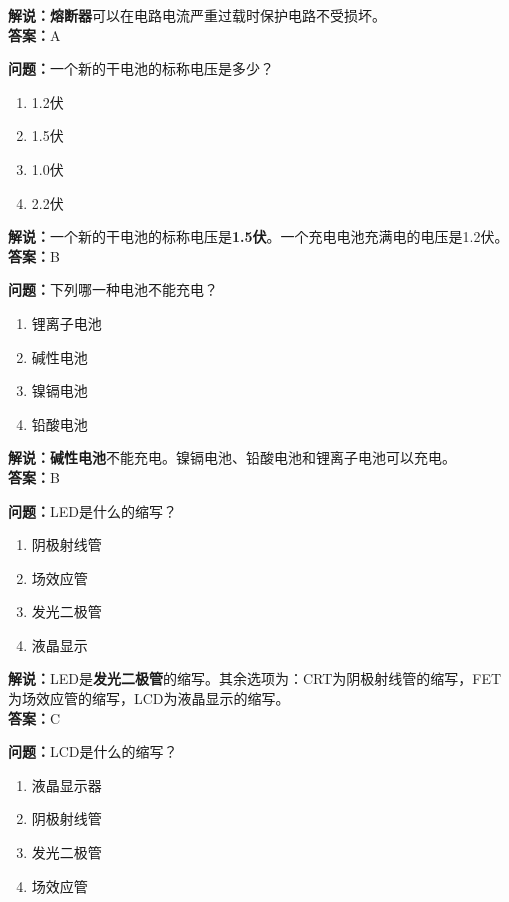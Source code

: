 \documentclass{ctexbook}
\begin{document}
\noindent\textbf{解说：熔断器}可以在电路电流严重过载时保护电路不受损坏。\\\noindent\textbf{答案：}A
\bigskip


\noindent\textbf{问题：}一个新的干电池的标称电压是多少？

\begin{enumerate}[label=\Alph*), leftmargin=3em]
	\item 1.2伏
	\item 1.5伏
	\item 1.0伏
	\item 2.2伏
\end{enumerate}

\noindent\textbf{解说：}一个新的干电池的标称电压是\textbf{1.5伏}。一个充电电池充满电的电压是1.2伏。\\\noindent\textbf{答案：}B

\bigskip


\noindent\textbf{问题：}下列哪一种电池不能充电？

\begin{enumerate}[label=\Alph*), leftmargin=3em]
	\item 锂离子电池
	\item 碱性电池
	\item 镍镉电池
	\item 铅酸电池
\end{enumerate}

\noindent\textbf{解说：碱性电池}不能充电。镍镉电池、铅酸电池和锂离子电池可以充电。\\\noindent\textbf{答案：}B
\bigskip


\noindent\textbf{问题：}LED是什么的缩写？

\begin{enumerate}[label=\Alph*), leftmargin=3em]
	\item 阴极射线管
	\item 场效应管
	\item 发光二极管
	\item 液晶显示
\end{enumerate}

\noindent\textbf{解说：}LED是\textbf{发光二极管}的缩写。其余选项为：CRT为阴极射线管的缩写，FET为场效应管的缩写，LCD为液晶显示的缩写。\\\noindent\textbf{答案：}C

\bigskip


\noindent\textbf{问题：}LCD是什么的缩写？

\begin{enumerate}[label=\Alph*), leftmargin=3em]
	\item 液晶显示器
	\item 阴极射线管
	\item 发光二极管
	\item 场效应管
\end{enumerate}
\end{document}
